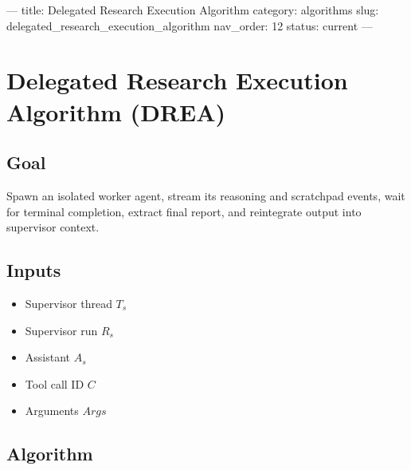 ---
title: Delegated Research Execution Algorithm
category: algorithms
slug: delegated_research_execution_algorithm
nav_order: 12
status: current
---

\section{Delegated Research Execution Algorithm (DREA)}

\subsection*{Goal}

Spawn an isolated worker agent, stream its reasoning and scratchpad events,
wait for terminal completion, extract final report, and reintegrate output
into supervisor context.

\subsection*{Inputs}

\begin{itemize}
    \item Supervisor thread $T_s$
    \item Supervisor run $R_s$
    \item Assistant $A_s$
    \item Tool call ID $C$
    \item Arguments $Args$
\end{itemize}

\subsection*{Algorithm}

